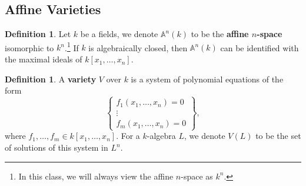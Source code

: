 \documentclass{tufte-handout} %
\theoremstyle{definition}
\newtheorem{defn}[thm]{Definition}
\theoremstyle{remark}
\newcommand{\bA}{\mathbb{A}}
\begin{document}
\subsection{Affine Varieties}

\begin{defn}
	Let $k$ be a fields, we denote $\bA^n(k)$ to be the \textbf{affine $n$-space} isomorphic to $k^n$.\footnote{In this class, we will always view the affine $n$-space as $k^n$.} If $k$ is algebraically closed, then $\bA^n(k)$ can be identified with the maximal ideals of $k[x_1, \dots, x_n]$.
\end{defn}

\begin{defn}
	A \textbf{variety} $V$ over $k$ is a system of polynomial equations of the form 
	\[\begin{Bmatrix}
		f_1(x_1, \dots, x_n) = 0\\
		\vdots \\
		f_m(x_1, \dots, x_n) = 0
	\end{Bmatrix},\]
	where $f_1, \dots, f_m \in k[x_1, \dots, x_n]$. For a $k$-algebra $L$, we denote $V(L)$ to be the set of solutions of this system in $L^n$.
\end{defn}
\end{document}
